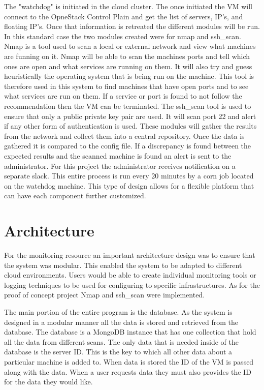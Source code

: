 \documentclass[12pt]{article}
\begin{document}
The "watchdog" is initiated in the cloud cluster. The once initiated the VM will connect to the OpneStack Control Plain and get the list of servers, IP's, and floating IP's. Once that information is retreated the different modules will be run. In this standard case the two modules created were for nmap and ssh\_scan. Nmap is a tool used to scan a local or external network and view what machines are funning on it. Nmap will be able to scan the machines ports and tell which ones are open and what services are running on them. It will also try and guess heuristically the operating system that is being run on the machine. This tool is therefore used in this system to find machines that have open ports and to see what services are run on them. If a service or port is found to not follow the recommendation then the VM can be terminated. The ssh\_scan tool is used to ensure that only a public private key pair are used. It will scan port 22 and alert if any other form of authentication is used.
These modules will gather the results from the network and collect them into a central repository. Once the data is gathered it is compared to the config file.  If a discrepancy is found between the expected results and the scanned machine is found an alert is sent to the administrator. For this project the administrator receives notification on a separate slack. This entire process is run every 20 minutes by a corn job located on the watchdog machine. This type of design allows for a flexible platform that can have each component further customized.

\section{Architecture}
For the monitoring resource an important architecture design was to ensure that the system was modular.  This enabled the system to be adapted to different cloud environments. Users would be able to create individual monitoring tools or logging techniques to be used for configuring to specific infrastructures. As for the proof of concept project Nmap and ssh\_scan were implemented.

The main portion of the entire program is the database. As the system is designed in a modular manner all the data is stored and retrieved from the database. The database is a MongoDB instance that has one collection that hold all the data from different scans. The only data that is needed inside of the database is the server ID\@. This is the key to which all other data about a particular machine is added to. When data is stored the ID of the VM is passed along with the data. When a user requests data they must also provides the ID for the data they would like.
\end{document}
